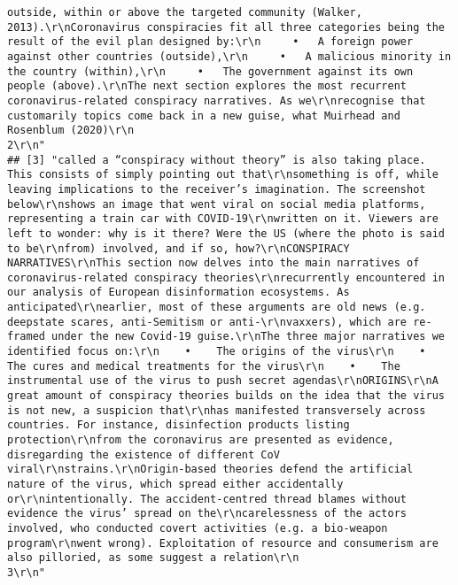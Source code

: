 \documentclass[
]{book}
\begin{document}
\begin{verbatim}
outside, within or above the targeted community (Walker, 2013).\r\nCoronavirus conspiracies fit all three categories being the result of the evil plan designed by:\r\n     •   A foreign power against other countries (outside),\r\n     •   A malicious minority in the country (within),\r\n     •   The government against its own people (above).\r\nThe next section explores the most recurrent coronavirus-related conspiracy narratives. As we\r\nrecognise that customarily topics come back in a new guise, what Muirhead and Rosenblum (2020)\r\n                                                                                                         2\r\n"
## [3] "called a “conspiracy without theory” is also taking place. This consists of simply pointing out that\r\nsomething is off, while leaving implications to the receiver’s imagination. The screenshot below\r\nshows an image that went viral on social media platforms, representing a train car with COVID-19\r\nwritten on it. Viewers are left to wonder: why is it there? Were the US (where the photo is said to be\r\nfrom) involved, and if so, how?\r\nCONSPIRACY NARRATIVES\r\nThis section now delves into the main narratives of coronavirus-related conspiracy theories\r\nrecurrently encountered in our analysis of European disinformation ecosystems. As anticipated\r\nearlier, most of these arguments are old news (e.g. deepstate scares, anti-Semitism or anti-\r\nvaxxers), which are re-framed under the new Covid-19 guise.\r\nThe three major narratives we identified focus on:\r\n    •    The origins of the virus\r\n    •    The cures and medical treatments for the virus\r\n    •    The instrumental use of the virus to push secret agendas\r\nORIGINS\r\nA great amount of conspiracy theories builds on the idea that the virus is not new, a suspicion that\r\nhas manifested transversely across countries. For instance, disinfection products listing protection\r\nfrom the coronavirus are presented as evidence, disregarding the existence of different CoV viral\r\nstrains.\r\nOrigin-based theories defend the artificial nature of the virus, which spread either accidentally or\r\nintentionally. The accident-centred thread blames without evidence the virus’ spread on the\r\ncarelessness of the actors involved, who conducted covert activities (e.g. a bio-weapon program\r\nwent wrong). Exploitation of resource and consumerism are also pilloried, as some suggest a relation\r\n                                                                                                     3\r\n"                                                                                                                                                                                                                                                                                                                                                                                                                                                                                                                                                                                                                                                                                                                                                                                                        
\end{verbatim}
\end{document}

